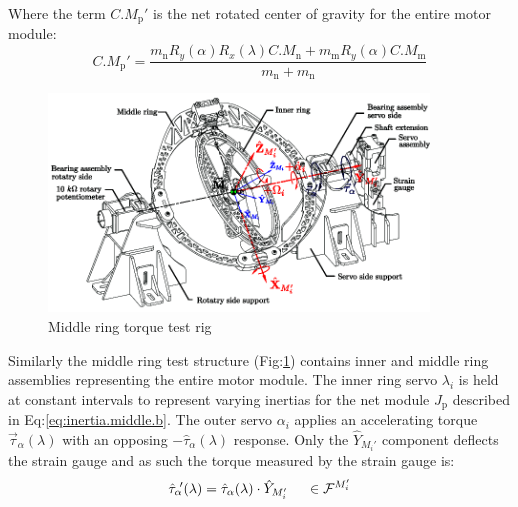 Where the term $C.M_{\text{p}}'$ is the net rotated center of gravity for the entire motor module:
\begin{equation}
C.M_\text{p}'=\frac{m_\text{n}R_y(\alpha)R_x(\lambda)C.M_\text{n}+m_\text{m}R_y(\alpha)C.M_\text{m}}{m_\text{n}+m_\text{n}}
\end{equation}
\par
\begin{figure}[htbp]
\centering
\includegraphics[width=0.9\textwidth]{figs/torque-middle}
\caption{Middle ring torque test rig}
\label{fig:torque-middle}
\vspace{-6pt}
\end{figure}
Similarly the middle ring test structure (Fig:\ref{fig:torque-middle}) contains inner and middle ring assemblies representing the entire motor module. The inner ring servo $\lambda_i$ is held at constant intervals to represent varying inertias for the net module $J_\text{p}$ described in Eq:\ref{eq:inertia.middle.b}. The outer servo $\alpha_i$ applies an accelerating torque $\vec{\tau}_\alpha(\lambda)$ with an opposing $-\hat{\tau}_\alpha(\lambda)$ response. Only the $\hat{Y}_{M_i'}$ component deflects the strain gauge and as such the torque measured by the strain gauge is:
\begin{equation}
\hat{\tau}_\alpha\text{}\hspace{-2pt}'(\lambda)=\hat{\tau}_\alpha(\lambda)\cdot\hat{Y}_{M_i'}~~~~\in\mathcal{F}^{M_i'}
\end{equation}

